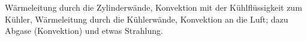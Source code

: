Wärmeleitung durch die Zylinderwände, Konvektion mit der Kühlflüssigkeit zum Kühler, Wärmeleitung durch die Kühlerwände, Konvektion an die Luft; dazu Abgase (Konvektion) und etwas Strahlung.
